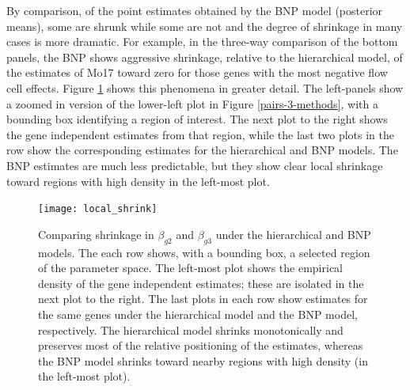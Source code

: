 {By comparison, of the point estimates obtained by the BNP model (posterior means), some are shrunk while some are not and the degree of shrinkage in many cases is more dramatic. For example, in the three-way comparison of the bottom panels, the BNP shows aggressive shrinkage, relative to the hierarchical model, of the estimates of Mo17 toward zero for those genes with the most negative flow cell effects. Figure \ref{method-compare} shows this phenomena in greater detail. The left-panels show a zoomed in version of the lower-left plot in Figure \ref{pairs-3-methods}, with a bounding box identifying a region of interest. The next plot to the right shows the gene independent estimates from that region, while the last two plots in the row show the corresponding estimates for the hierarchical and BNP models. The BNP estimates are much less predictable, but they show clear local shrinkage toward regions with high density in the left-most plot. %
\begin{figure}
\centering
\texttt{[image: local\_shrink]}
\caption{\small Comparing shrinkage in $\beta_{g2}$ and $\beta_{g3}$ under the hierarchical and BNP models. The each row shows, with a bounding box, a selected region of the parameter space. The left-most plot shows the empirical density of the gene independent estimates; these are isolated in the next plot to the right. The last plots in each row show estimates for the same genes under the hierarchical model and the BNP model, respectively. The hierarchical model shrinks monotonically and preserves most of the relative positioning of the estimates, whereas the BNP model shrinks toward nearby regions with high density (in the left-most plot).}
\label{method-compare}
\end{figure}

}
